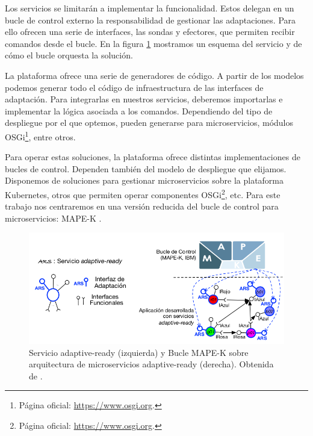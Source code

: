 Los servicios  se limitarán a implementar la funcionalidad. Estos delegan en un bucle de control externo la responsabilidad de gestionar las adaptaciones. Para ello ofrecen una serie de interfaces, las sondas y efectores, que permiten recibir comandos desde el bucle. En la figura \ref{fig:adaptive-ready-services} mostramos un esquema del servicio y de cómo el bucle orquesta la solución.

La plataforma ofrece una serie de generadores de código. A partir de los modelos podemos generar todo el código de infraestructura de las interfaces de adaptación. Para integrarlas en nuestros servicios, deberemos importarlas e implementar la lógica asociada a los comandos. Dependiendo del tipo de despliegue por el que optemos, pueden generarse para microservicios, módulos OSGi\footnote{Página oficial: \url{https://www.osgi.org}.}, entre otros.

\pagebreak

Para operar estas soluciones, la plataforma ofrece distintas implementaciones de bucles de control. Dependen también del modelo de despliegue que elijamos. Disponemos de soluciones para gestionar microservicios sobre la plataforma Kubernetes\cite{fonsServiciosAdaptivereadyPara2021}, otros que permiten operar componentes OSGi\footnote{Página oficial: \url{https://www.osgi.org}.}, etc. Para este trabajo nos centraremos en una versión reducida del bucle de control para microservicios: MAPE-K .

\begin{figure}[htb]
  \centering
  \includegraphics[scale=0.4]{cap_sistema_original/images/adaptive-ready-services}
  \caption[Servicio adaptive-ready y Bucle MAPE-K sobre arquitectura de mi-
  croservicios adaptive-ready.]{Servicio adaptive-ready (izquierda) y Bucle MAPE-K sobre arquitectura de microservicios adaptive-ready (derecha). Obtenida de \cite{fonsServiciosAdaptivereadyPara2021}.}
  \label{fig:adaptive-ready-services}
\end{figure}


